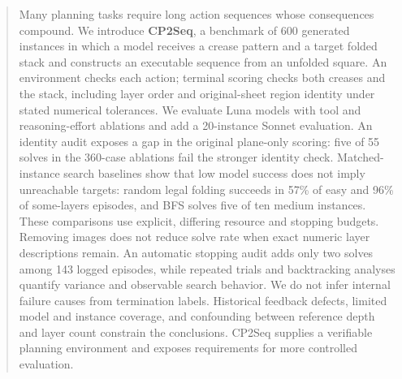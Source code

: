 \begin{abstract}
Many planning tasks require long action sequences whose consequences compound. We introduce
\textbf{CP2Seq}, a benchmark of 600 generated instances in which a model receives a crease
pattern and a target folded stack and constructs an executable sequence from an unfolded
square. An environment checks each action; terminal scoring checks both creases and the
stack, including layer order and original-sheet region identity under stated numerical
tolerances. We evaluate Luna models with tool and reasoning-effort ablations and add a
20-instance Sonnet evaluation. An identity audit exposes a gap in the original plane-only
scoring: five of 55 solves in the 360-case ablations fail the stronger identity check.
Matched-instance search baselines show that low model success does not imply unreachable
targets: random legal folding succeeds in 57\% of easy and 96\% of some-layers episodes,
and BFS solves five of ten medium instances. These comparisons use explicit, differing
resource and stopping budgets. Removing images does not reduce solve rate when exact
numeric layer descriptions remain. An automatic stopping audit adds only two solves
among 143 logged episodes, while repeated trials and backtracking analyses quantify
variance and observable search behavior. We do not infer internal failure causes from
termination labels. Historical feedback defects, limited model and instance coverage,
and confounding between reference depth and layer count constrain the conclusions.
CP2Seq supplies a verifiable planning environment and exposes requirements for more
controlled evaluation.
\end{abstract}
